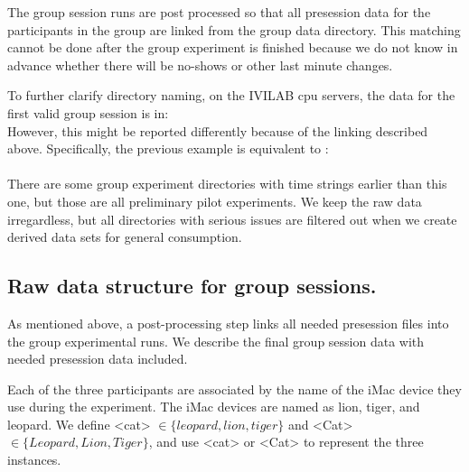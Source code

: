 The group session runs are post processed so that all presession data for the
participants in the group are linked from the group data directory. This
matching cannot be done after the group experiment is finished because we do not
know in advance whether there will be no-shows or other last minute changes. 

To further clarify directory naming, on the IVILAB cpu servers,
the data for the first valid group session 
is in:\\
However, this might be reported  differently because of the linking described
above. Specifically, the previous example is equivalent to :\\
\\
There are some group experiment directories with time strings earlier than this
one, but those are all preliminary pilot experiments. We keep the raw data
irregardless, but all directories with serious issues are filtered out when we
create derived data sets for general consumption.

\subsection{Raw data structure for group sessions.}

As mentioned above, a post-processing step links all needed presession files into
the group experimental runs. We describe the final group session data with
needed presession data included. 


Each of the three participants are associated by the name of the iMac device
they use during the experiment.
The iMac devices are named as lion, tiger, and
leopard. We define 
<cat> $\in \{leopard, lion, tiger\}$ 
and <Cat> $\in \{Leopard, Lion, Tiger\}$,
and use <cat> or <Cat> to represent the three instances. 



